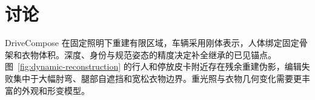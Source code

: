 \section{讨论}
\label{sec:discussion}

DriveCompose 在固定照明下重建有限区域，车辆采用刚体表示，人体绑定固定骨架和衣物体积。深度、身份与规范姿态的精度决定补全继承的已见锚点。图~\ref{fig:dynamic-reconstruction} 的行人和停放皮卡附近存在残余重建伪影，编辑失败集中于大幅肘弯、腿部自遮挡和宽松衣物边界。重光照与衣物几何变化需要更丰富的外观和形变模型。
